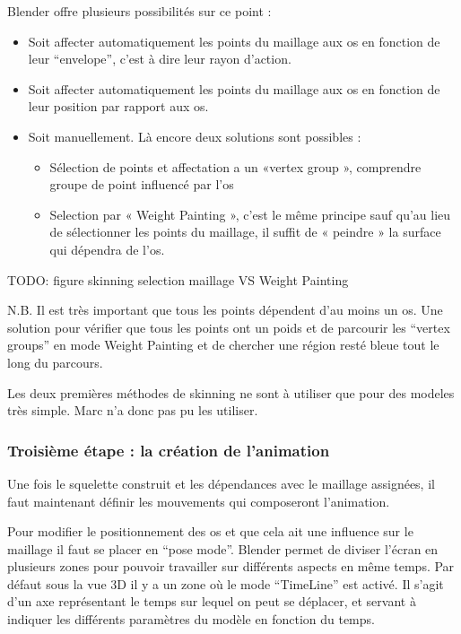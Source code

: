 \documentclass[11pt]{report}
\begin{document}
Blender offre plusieurs possibilités sur ce point :

\begin{itemize}
\item Soit affecter automatiquement les points du maillage aux os en  fonction de leur ``envelope'', c’est à dire leur rayon d’action.
\item Soit affecter automatiquement les points du maillage aux os en  fonction de leur position par rapport aux os.
\item Soit manuellement. Là encore deux solutions sont possibles :
\begin{itemize}
\item Sélection de points et affectation a un «vertex group », comprendre groupe de point influencé par l’os
\item Selection par « Weight Painting », c’est le même principe sauf qu’au lieu de sélectionner les points du maillage, il suffit de « peindre » la surface qui dépendra de l’os.
\end{itemize}
\end{itemize}

TODO: figure skinning selection maillage VS Weight Painting

N.B. Il est très important que tous les points dépendent d’au moins un os. Une solution pour vérifier que tous les points ont un poids et de parcourir les ``vertex groups'' en mode Weight Painting et de chercher une région resté bleue tout le long du parcours.

Les deux premières méthodes de skinning ne sont à utiliser que pour des modeles très simple. Marc n’a donc pas pu les utiliser.

\subsubsection{Troisième étape : la création de l’animation}

Une fois le squelette construit et les dépendances avec le maillage assignées, il faut maintenant définir les mouvements qui composeront l’animation.

Pour modifier le positionnement des os et que cela ait une influence sur le maillage il faut se placer en ``pose mode''.  Blender permet de diviser l’écran en plusieurs zones pour pouvoir travailler sur différents aspects en même temps. Par défaut sous la vue 3D il y a un zone où le mode ``TimeLine'' est activé. Il s’agit d’un axe représentant le temps sur lequel on peut se déplacer, et servant à indiquer les différents paramètres du modèle en fonction du temps.
\end{document}

